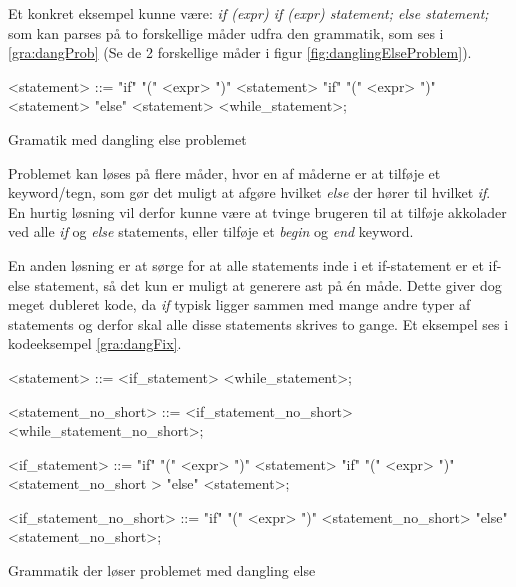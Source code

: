 Et konkret eksempel kunne være: \textit{if (expr) if (expr) statement; else statement;} som kan parses på to forskellige måder udfra den grammatik, som ses i  \ref{gra:dangProb} (Se de 2 forskellige måder i figur \ref{fig:danglingElseProblem}).

\begin{Grammar}
 \begin{grammar}
    <statement> ::= "if" "(" <expr> ")" <statement> 
    \alt "if" "(" <expr> ")" <statement> "else" <statement>
    \alt <while\_statement>;
 \end{grammar}
 \caption{Gramatik med dangling else problemet}\label{gra:dangProb}
\end{Grammar}


\noindent Problemet kan løses på flere måder, hvor en af måderne er at tilføje et keyword/tegn, som gør det muligt at afgøre hvilket \textit{else} der hører til hvilket \textit{if}. En hurtig løsning vil derfor kunne være at tvinge brugeren til at tilføje akkolader ved alle \textit{if} og \textit{else} statements, eller tilføje et \textit{begin} og \textit{end} keyword.

En anden løsning er at sørge for at alle statements inde i et if-statement er et if-else statement, så det kun er muligt at generere \gls{ast} på én måde. Dette giver dog meget dubleret kode, da \textit{if} typisk ligger sammen med mange andre typer af statements og derfor skal alle disse statements skrives to gange. Et eksempel ses i kodeeksempel \ref{gra:dangFix}.

\begin{Grammar}
 \begin{grammar}
    <statement> ::= <if\_statement>
    \alt <while\_statement>;
    
    <statement\_no\_short> ::= <if\_statement\_no\_short>
    \alt <while\_statement\_no\_short>;
    
    <if\_statement> ::= "if" "(" <expr> ")" <statement> 
    \alt"if" "(" <expr> ")" <statement\_no\_short > "else" <statement>;
    
    <if\_statement\_no\_short> ::= "if" "(" <expr> ")" <statement\_no\_short> "else" <statement\_no\_short>;
 \end{grammar}
 \caption{Grammatik der løser problemet med dangling else}\label{gra:dangFix}
\end{Grammar}

